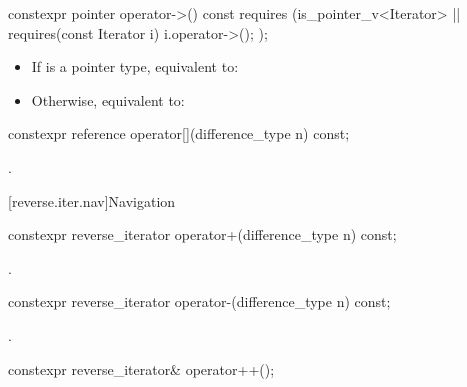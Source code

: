 %
\begin{itemdecl}
constexpr pointer operator->() const
  requires (is_pointer_v<Iterator> ||
            requires(const Iterator i) { i.operator->(); });
\end{itemdecl}

\begin{itemdescr}
\pnum
\effects
\begin{itemize}
\item If  is a pointer type, equivalent to:

\item Otherwise, equivalent to:
\end{itemize}
\end{itemdescr}

%
\begin{itemdecl}
constexpr reference operator[](difference_type n) const;
\end{itemdecl}

\begin{itemdescr}
\pnum
\returns
{}.
\end{itemdescr}

[reverse.iter.nav]{Navigation}

%
\begin{itemdecl}
constexpr reverse_iterator operator+(difference_type n) const;
\end{itemdecl}

\begin{itemdescr}
\pnum
\returns
{}.
\end{itemdescr}

%
\begin{itemdecl}
constexpr reverse_iterator operator-(difference_type n) const;
\end{itemdecl}

\begin{itemdescr}
\pnum
\returns
{}.
\end{itemdescr}

%
\begin{itemdecl}
constexpr reverse_iterator& operator++();
\end{itemdecl}

